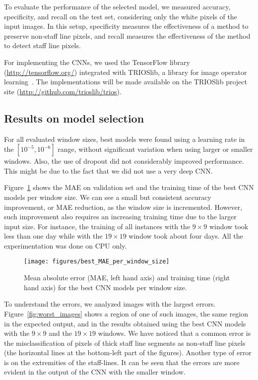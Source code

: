 \documentclass[conference]{IEEEtran}
\begin{document}
To evaluate the performance of the selected model, we measured
accuracy, specificity, and recall on the test set, considering only
the white pixels of the input images. In this setup, specificity
measures the effectiveness of a method to preserve non-staff line
pixels, and recall measures the effectiveness of the method to detect
staff line pixels.

For implementing the CNNs, we used the TensorFlow library
(\url{http://tensorflow.org/}) %
integrated with TRIOSlib, a library for image operator
learning~\cite{2016:tutorialSIB}. The implementations will be made
available on the TRIOSlib project site
(\url{http://github.com/trioslib/trios}).


\subsection{Results on model selection}

For all evaluated window sizes, best models were found using a
learning rate in the $[10^{-5}, 10^{-6}]$ range, without significant
variation when using larger or smaller windows. Also, the use of
dropout did not considerably improved performance. This might be due
to the fact that we did not use a very deep CNN.

Figure~\ref{fig:best_window} shows the MAE on validation set and
the training time of the best CNN models per window size. We can see a
small but consistent accuracy improvement, or MAE reduction, as the
window size is incremented. However, such improvement also requires an
increasing training time due to the larger input size. 
For instance, the training of all instances with the $9\times 9$
window took less than one day while with  the $19\times 19$ window
took about four days. All the experimentation was done on CPU only.


\begin{figure}[htb]
\centering
\texttt{[image: figures/best\_MAE\_per\_window\_size]}
\caption{Mean absolute error (MAE, left hand axis) and 
training time (right hand axis) for the best CNN models 
per window size.}
\label{fig:best_window} 
\end{figure}

To understand the errors, we analyzed images with the largest
errors. Figure~\ref{fig:worst_images} shows a region of one of such
images, the same region in the expected output, and in the results
obtained using the best CNN models with the $9\times9$ and the
$19\times19$ windows. We have noticed that a common error is the
misclassification of pixels of thick staff line segments as non-staff
line pixels (the horizontal lines at the bottom-left part of the
figures). Another type of error is on the extremities of the
staff-lines.
It can be seen that the errors are more evident in the output of the
CNN with the smaller window.
\end{document}
